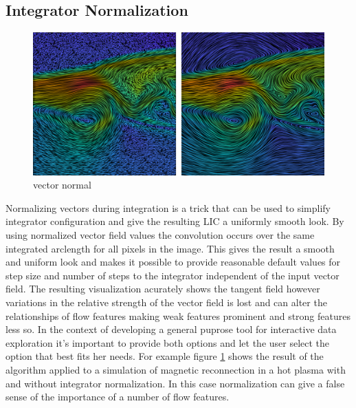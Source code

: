 \documentclass[a4paper,10pt]{article}
\begin{document}
\subsection{Integrator Normalization}
\begin{figure}[htpb]
 \centering
 \includegraphics[width=\textwidth]{./images-data/vector-norm/vec-norm.png}
 \caption{vector normal}
 \label{fig:vec-norm}
\end{figure}

Normalizing vectors during integration is a trick that can be used to simplify integrator configuration and give the resulting LIC a uniformly smooth look. By using normalized vector field values the convolution occurs over the same integrated arclength for all pixels in the image. This gives the result a smooth and uniform look and makes it possible to provide reasonable default values for step size and number of steps to the integrator independent of the input vector field. The resulting visualization acurately shows the tangent field however variations in the relative strength of the vector field is lost and can alter the relationships of flow features making weak features prominent and strong features less so. In the context of developing a general puprose tool for interactive data exploration it's important to provide both options and let the user select the option that best fits her needs. For example figure \ref{fig:vec-norm} shows the result of the algorithm applied to a simulation of magnetic reconnection in a hot plasma with and without integrator normalization. In this case normalization can give a false sense of the importance of a number of flow features.
\end{document}
